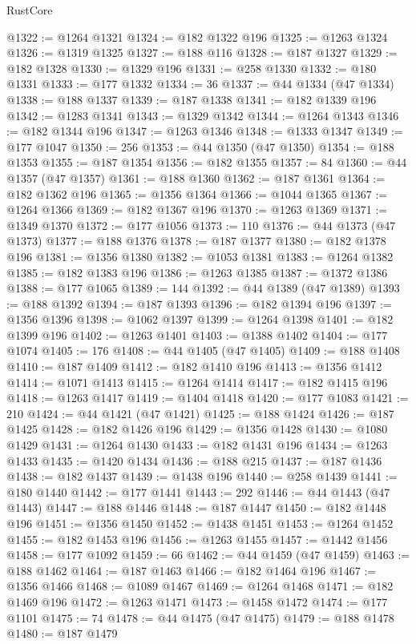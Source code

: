 \begin{lexlean}{RustCore}
\begin{coremodule}
@1322 := @1264 @1321
@1324 := @182 @1322 @196
@1325 := @1263 @1324
@1326 := @1319 @1325
@1327 := @188 @116
@1328 := @187 @1327
@1329 := @182 @1328
@1330 := @1329 @196
@1331 := @258 @1330
@1332 := @180 @1331
@1333 := @177 @1332
@1334 := 36
@1337 := @44 @1334 (@47 @1334)
@1338 := @188 @1337
@1339 := @187 @1338
@1341 := @182 @1339 @196
@1342 := @1283 @1341
@1343 := @1329 @1342
@1344 := @1264 @1343
@1346 := @182 @1344 @196
@1347 := @1263 @1346
@1348 := @1333 @1347
@1349 := @177 @1047
@1350 := 256
@1353 := @44 @1350 (@47 @1350)
@1354 := @188 @1353
@1355 := @187 @1354
@1356 := @182 @1355
@1357 := 84
@1360 := @44 @1357 (@47 @1357)
@1361 := @188 @1360
@1362 := @187 @1361
@1364 := @182 @1362 @196
@1365 := @1356 @1364
@1366 := @1044 @1365
@1367 := @1264 @1366
@1369 := @182 @1367 @196
@1370 := @1263 @1369
@1371 := @1349 @1370
@1372 := @177 @1056
@1373 := 110
@1376 := @44 @1373 (@47 @1373)
@1377 := @188 @1376
@1378 := @187 @1377
@1380 := @182 @1378 @196
@1381 := @1356 @1380
@1382 := @1053 @1381
@1383 := @1264 @1382
@1385 := @182 @1383 @196
@1386 := @1263 @1385
@1387 := @1372 @1386
@1388 := @177 @1065
@1389 := 144
@1392 := @44 @1389 (@47 @1389)
@1393 := @188 @1392
@1394 := @187 @1393
@1396 := @182 @1394 @196
@1397 := @1356 @1396
@1398 := @1062 @1397
@1399 := @1264 @1398
@1401 := @182 @1399 @196
@1402 := @1263 @1401
@1403 := @1388 @1402
@1404 := @177 @1074
@1405 := 176
@1408 := @44 @1405 (@47 @1405)
@1409 := @188 @1408
@1410 := @187 @1409
@1412 := @182 @1410 @196
@1413 := @1356 @1412
@1414 := @1071 @1413
@1415 := @1264 @1414
@1417 := @182 @1415 @196
@1418 := @1263 @1417
@1419 := @1404 @1418
@1420 := @177 @1083
@1421 := 210
@1424 := @44 @1421 (@47 @1421)
@1425 := @188 @1424
@1426 := @187 @1425
@1428 := @182 @1426 @196
@1429 := @1356 @1428
@1430 := @1080 @1429
@1431 := @1264 @1430
@1433 := @182 @1431 @196
@1434 := @1263 @1433
@1435 := @1420 @1434
@1436 := @188 @215
@1437 := @187 @1436
@1438 := @182 @1437
@1439 := @1438 @196
@1440 := @258 @1439
@1441 := @180 @1440
@1442 := @177 @1441
@1443 := 292
@1446 := @44 @1443 (@47 @1443)
@1447 := @188 @1446
@1448 := @187 @1447
@1450 := @182 @1448 @196
@1451 := @1356 @1450
@1452 := @1438 @1451
@1453 := @1264 @1452
@1455 := @182 @1453 @196
@1456 := @1263 @1455
@1457 := @1442 @1456
@1458 := @177 @1092
@1459 := 66
@1462 := @44 @1459 (@47 @1459)
@1463 := @188 @1462
@1464 := @187 @1463
@1466 := @182 @1464 @196
@1467 := @1356 @1466
@1468 := @1089 @1467
@1469 := @1264 @1468
@1471 := @182 @1469 @196
@1472 := @1263 @1471
@1473 := @1458 @1472
@1474 := @177 @1101
@1475 := 74
@1478 := @44 @1475 (@47 @1475)
@1479 := @188 @1478
@1480 := @187 @1479

\end{coremodule}
\end{lexlean}
